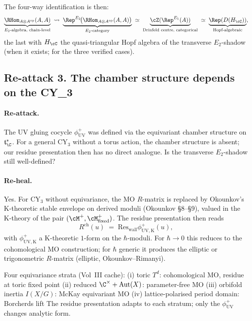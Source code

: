 The four-way identification is then:
\[
 \underbrace{\RHom_{A \otimes A^{\mathrm{op}}}(A, A)}_{E_2\text{-algebra,
 chain-level}}
 \;\leadsto\;
 \underbrace{\Rep^{E_2}\!\bigl(\RHom_{A \otimes A^{\mathrm{op}}}(A, A)
 \bigr)}_{E_2\text{-category}}
 \;\simeq\;
 \underbrace{\cZ(\Rep^{E_1}(A))}_{\text{Drinfeld centre, categorical}}
 \;\simeq\;
 \underbrace{\Rep(D(H_\cC))}_{\text{Hopf-algebraic}},
\]
the last with $H_\cC$ the quasi-triangular Hopf algebra of the
transverse $E_2$-shadow (when it exists; for the three verified cases).


\subsection*{Re-attack 3.  The chamber structure depends on the CY_3}

\paragraph{Re-attack.}  The UV gluing cocycle $\phi^+_{\mathrm{UV}}$
was defined via the equivariant chamber structure on
$\mathfrak{t}^*_\C$.  For a general CY$_3$ without a torus action, the
chamber structure is absent; our residue presentation then has no
direct analogue.  Is the transverse $E_2$-shadow still well-defined?

\paragraph{Re-heal.}  Yes.  For CY$_3$ without equivariance, the MO
$R$-matrix is replaced by Okounkov's K-theoretic stable envelope
on derived moduli (Okounkov \cite{Okounkov2017Lectures} \S 8--\S 9),
valued in the K-theory of the pair $(\cM^+, \cM^+_{\mathrm{fixed}})$.
The residue presentation then reads
\[
 R^{\mathrm{ch}}(u) \;=\;
 \mathrm{Res}_{\mathrm{wall}} \phi^+_{\mathrm{UV,K}}(u),
\]
with $\phi^+_{\mathrm{UV,K}}$ a K-theoretic $1$-form on the
$\hbar$-moduli.  For $\hbar \to 0$ this reduces to the cohomological
MO construction; for $\hbar$ generic it produces the elliptic or
trigonometric $R$-matrix (elliptic, Okounkov--Rimanyi).

Four equivariance strata (Vol~III cache):
(i)  toric $T^d$: cohomological MO, residue at toric fixed point
(ii) reduced $\C^\times + \mathrm{Aut}(X)$: parameter-free MO
(iii) orbifold inertia $I(X/G)$: McKay equivariant MO
(iv) lattice-polarised period domain: Borcherds lift
The residue presentation adapts to each stratum; only the
$\phi^+_{\mathrm{UV}}$ changes analytic form.


